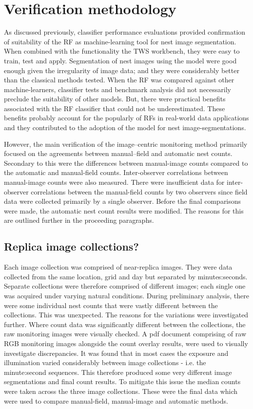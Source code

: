 \section{Verification methodology}\label{sec:verification}
As discussed previously, classifier performance evaluations provided confirmation of suitability of the \ac{RF} as machine-learning tool for nest image segmentation. When combined with the functionality the \ac{TWS} workbench, they were easy to train, test and apply. Segmentation of nest images using the model were good enough given the irregularity of image data; and they were considerably better than the classical methods tested. When the \ac{RF} was compared against other machine-learners, classifier tests and benchmark analysis did not necessarily preclude the suitability of other models. But, there were practical benefits associated with the \ac{RF} classifier that could not be underestimated. These benefits probably account for the popularly of \acp{RF} in real-world data applications and they contributed to the adoption of the model for nest image-segmentations.

However, the main verification of the image--centric monitoring method primarily focused on the agreements between manual--field and automatic nest counts. Secondary to this were the differences between manual-image counts compared to the automatic and manual-field counts. Inter-observer correlations between manual-image counts were also measured. There were insufficient data for inter-observer correlations between the manual-field counts by two observers since field data were collected primarily by a single observer. Before the final comparisons were made, the automatic nest count results were modified. The reasons for this are outlined further in the proceeding paragraphs.

\subsection{Replica image collections?}
Each image collection was comprised of near-replica images. They were data collected from the same location, grid and day but separated by minutes:seconds. Separate collections were therefore comprised of different images; each single one was acquired under varying natural conditions. During preliminary analysis, there were some individual nest counts that were vastly different between the collections. This was unexpected. The reasons for the variations were investigated further. Where count data was significantly different between the collections, the raw monitoring images were visually checked. A pdf document  comprising of raw \ac{RGB} monitoring images alongside the count overlay results, were used to visually investigate discrepancies. It was found that in most cases the exposure and illumination varied considerably between image collections - i.e. the minute:second sequences. This therefore produced some very different image segmentations and final count results. To mitigate this issue the median counts were taken across the three image collections. These were the final data which were used to compare manual-field, manual-image and automatic methods. 


